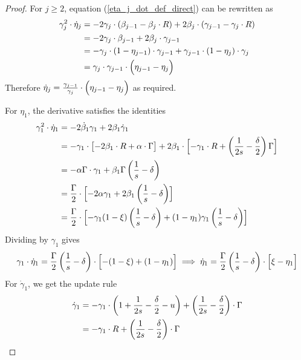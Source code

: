 \documentclass[a4paper,12pt]{article}
\begin{document}
\begin{proof}
For $j \geq 2$, equation (\ref{eta_j_dot_def_direct}) can be rewritten as
\begin{align}
\gamma_j^2 \cdot \dot{\eta}_j & = -2 \gamma_j \cdot (\beta_{j-1} - \beta_j \cdot R) + 2 \beta_j \cdot (\gamma_{j-1} - \gamma_j \cdot R) \notag \\
& = - 2 \gamma_j \cdot \beta_{j-1} + 2 \beta_j \cdot \gamma_{j-1} \notag \\
& = - \gamma_j \cdot (1 - \eta_{j-1}) \cdot \gamma_{j-1} + \gamma_{j-1} \cdot (1 - \eta_j) \cdot \gamma_j \notag \\
& = \gamma_j \cdot \gamma_{j-1} \cdot \Bigl( \eta_{j-1} - \eta_j \Bigr)
\end{align}
Therefore $\dot{\eta}_j = \frac{\gamma_{j-1}}{\gamma_j} \cdot \Bigl( \eta_{j-1} - \eta_j\Bigr)$ as required.

\medskip

For $\eta_1$, the derivative satisfies the identities
\begin{align}
\gamma_1^2 \cdot  \dot{\eta}_1 & = -2 \dot{\beta}_1  \gamma_1 + 2 \beta_1  \dot{\gamma}_1 \\
& = - \gamma_1 \cdot \bigl[ -2 \beta_1 \cdot R + \alpha \cdot \Gamma \bigr] + 2 \beta_1 \cdot \Bigl[ - \gamma_1 \cdot R + \left( \frac{1}{2s} - \frac{\delta}{2} \right) \Gamma \Bigr] \\
& = - \alpha \Gamma \cdot \gamma_1 + \beta_1 \Gamma \left(\frac{1}{s} - \delta \right) \\
& = \frac{\Gamma}{2} \cdot \Bigl[ -2 \alpha \gamma_1 + 2 \beta_1 \left(\frac{1}{s} - \delta \right)  \Bigr] \\
& = \frac{\Gamma}{2} \cdot \Bigl[ - \gamma_1 (1 - \xi) \left(\frac{1}{s} - \delta \right)  + (1 - \eta_1) \gamma_1 \left(\frac{1}{s} - \delta \right)  \Bigr]
\end{align}
Dividing by $\gamma_1$ gives
$$
\gamma_1 \cdot \dot{\eta}_1 = \frac{\Gamma}{2} \left(\frac{1}{s} - \delta \right) \cdot \Bigl[ - (1 - \xi) + (1 - \eta_1) \Bigr] \implies \dot{\eta}_1 = \frac{\Gamma}{2} \left(\frac{1}{s} - \delta \right) \cdot \Bigl[ \xi - \eta_1 \Bigr]
$$
For $\dot{\gamma}_1$, we get the update rule
\begin{align}
\dot{\gamma}_1 & = - \gamma_1 \cdot \left(1 + \frac{1}{2s} - \frac{\delta}{2} - u\right) + \left(\frac{1}{2s} - \frac{\delta}{2}\right) \cdot \Gamma \notag \\
& = - \gamma_1 \cdot R + \left(\frac{1}{2s} - \frac{\delta}{2}\right) \cdot \Gamma
\end{align}
\end{proof}
\end{document}
